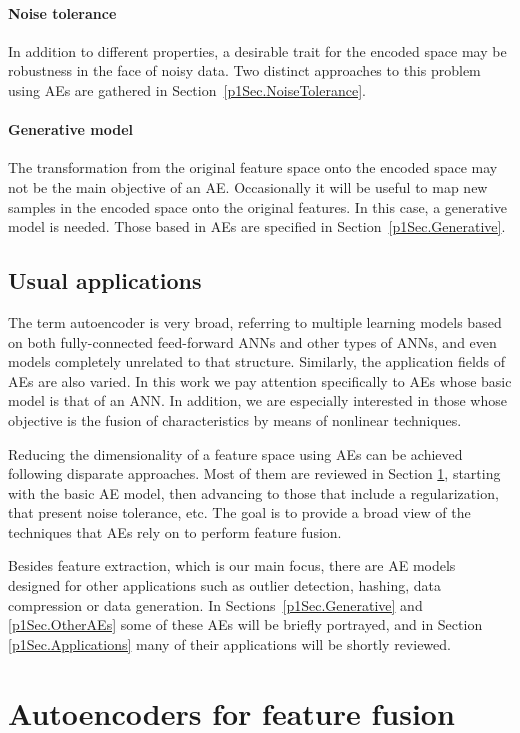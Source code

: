 \paragraph{Noise tolerance}
In addition to different properties, a desirable trait for the encoded space may be robustness in the face of noisy data. Two distinct approaches to this problem using AEs are gathered in Section~\ref{p1Sec.NoiseTolerance}.

\paragraph{Generative model}
The transformation from the original feature space onto the encoded space may not be the main objective of an AE. Occasionally it will be useful to map new samples in the encoded space onto the original features. In this case, a generative model is needed. Those based in AEs are specified in Section~\ref{p1Sec.Generative}.


\subsection{Usual applications}
The term autoencoder is very broad, referring to multiple learning models based on both fully-connected feed-forward ANNs and other types of ANNs, and even models completely unrelated to that structure. Similarly, the application fields of AEs are also varied.  In this work we pay attention specifically to AEs whose basic model is that of an ANN. In addition, we are especially interested in those whose objective is the fusion of characteristics by means of nonlinear techniques.

Reducing the dimensionality of a feature space using AEs can be achieved following disparate approaches. Most of them are reviewed in Section \ref{p1Sect.AEforFF}, starting with the basic AE model, then advancing to those that include a regularization, that present noise tolerance, etc. The goal is to provide a broad view of the techniques that AEs rely on to perform feature fusion.

Besides feature extraction, which is our main focus, there are AE models designed for other applications such as outlier detection, hashing, data compression or data generation. In Sections~\ref{p1Sec.Generative} and \ref{p1Sec.OtherAEs} some of these AEs will be briefly portrayed, and in Section \ref{p1Sec.Applications} many of their applications will be shortly reviewed. 


\section{Autoencoders for feature fusion}\label{p1Sect.AEforFF}

